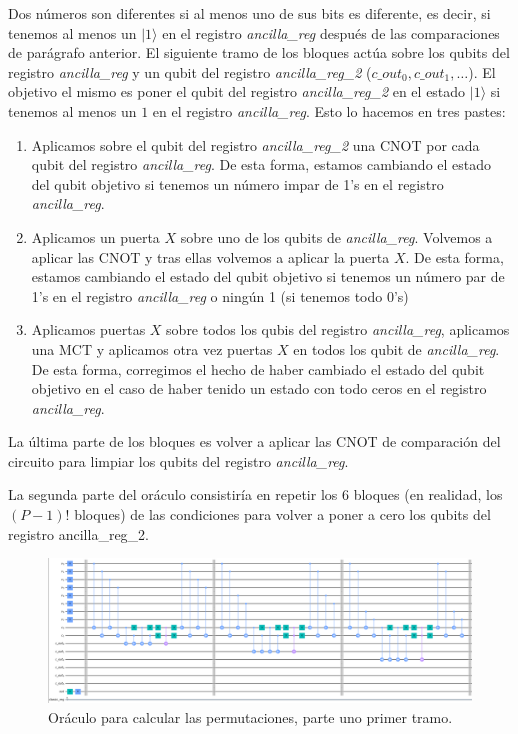 \documentclass[a4paper,11pt]{article} %
\numberwithin{equation}{section}
\begin{document}
Dos números son diferentes si al menos uno de sus bits es diferente, es decir, si tenemos al menos un $|1\rangle$ en el registro \textit{ancilla\_reg} después de las comparaciones de parágrafo anterior. El siguiente tramo de los bloques actúa sobre los qubits del registro \textit{ancilla\_reg} y un qubit del registro \textit{ancilla\_reg\_2} ($c\_out_0, c\_out_1, \dots$). El objetivo el mismo es poner el qubit del registro \textit{ancilla\_reg\_2} en el estado $|1\rangle$ si tenemos al menos un $1$ en el registro \textit{ancilla\_reg}. Esto lo hacemos en tres pastes:
\begin{enumerate}
	\item Aplicamos sobre el qubit del registro \textit{ancilla\_reg\_2} una CNOT por cada qubit del registro \textit{ancilla\_reg}. De esta forma, estamos cambiando el estado del qubit objetivo si tenemos un número impar de 1's en el registro \textit{ancilla\_reg}.
	
	\item Aplicamos un puerta $X$ sobre uno de los qubits de \textit{ancilla\_reg}. Volvemos a aplicar las CNOT y tras ellas volvemos a aplicar la puerta $X$. De esta forma, estamos cambiando el estado del qubit objetivo si tenemos un número par de 1's en el registro \textit{ancilla\_reg} o ningún 1 (si tenemos todo 0's) 
	
	\item Aplicamos puertas $X$ sobre todos los qubis del registro \textit{ancilla\_reg}, aplicamos una MCT y aplicamos otra vez puertas $X$ en todos los qubit de \textit{ancilla\_reg}. De esta forma, corregimos el hecho de haber cambiado el estado del qubit objetivo en el caso de haber tenido un estado con todo ceros en el registro \textit{ancilla\_reg}.
	
\end{enumerate}

La última parte de los bloques es volver a aplicar las CNOT de comparación del circuito para limpiar los qubits del registro \textit{ancilla\_reg}.

La segunda parte del oráculo consistiría en repetir los 6 bloques (en realidad, los $(P-1)!$ bloques) de las condiciones para volver a poner a cero los qubits del registro {ancilla\_reg\_2}.

	\begin{figure}[H]
	\centering 
	\includegraphics[width=1\linewidth]{Figuras/Fig_permitaciones_oracle_1.png}
	\caption{Oráculo para calcular las permutaciones, parte uno primer tramo.}
	\label{Fig_permitaciones_oracle_1.png}
	\end{figure}
\end{document}
